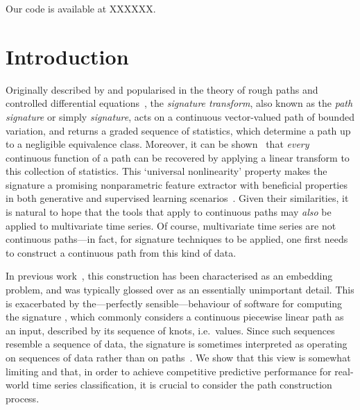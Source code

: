 \documentclass{article}
\begin{document}
Our code is available at XXXXXX.


\section{Introduction}

Originally described by \citet{Chen54, Chen57, Chen58} and popularised
in the theory of rough paths and controlled differential
equations~\cite{lyons1998differential, FritzVictoir10, lyons2014rough},
the \emph{signature transform}, also known as the \emph{path signature}
or simply \emph{signature}, acts on a continuous vector-valued path of
bounded variation, and returns a graded sequence of statistics, which
determine a path up to a negligible equivalence class. Moreover,
it can be shown~\cite[Proposition A.6]{kidger2019deep} that \emph{every}
continuous function of a path can be recovered by applying a linear
transform to this collection of statistics. This `universal
nonlinearity' property makes the signature a promising nonparametric
feature extractor with beneficial properties in both generative and
supervised learning scenarios~\citep{kidger2019deep}.
%
Given their similarities, it is natural to hope that the tools that
apply to continuous paths may \emph{also} be applied to multivariate
time series. Of course, multivariate time series are not continuous
paths---in fact, for signature techniques to be applied, one first needs
to construct a continuous path from this kind of data.

In previous work~\cite{kidger2019deep, levin2013, fermanian2019embedding}, this
construction has been characterised as an embedding problem, and was
typically glossed over as an essentially unimportant detail.
%
This is exacerbated by the---perfectly sensible---behaviour of software
for computing the signature \cite{iisignature, signatory}, which
commonly considers a continuous piecewise linear path as an input,
described by its sequence of knots, i.e.\ values.
%
Since such sequences resemble a sequence of data, the signature is
sometimes interpreted as operating on sequences of data rather than on
paths~\cite{kidger2019deep, levin2013}.
%
We show that this view is somewhat limiting and that, in order to
achieve competitive predictive performance for real-world time series
classification, it is crucial to consider the path construction process.
\end{document}

